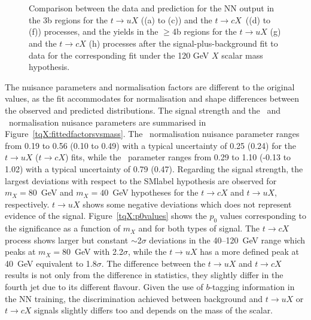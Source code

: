 \begin{figure}[htb]
    \RawFloats
    \centering
     \\
     \\ 
    \caption{Comparison between the data and prediction for the NN output in the 3b regions for the $t\to uX$ ((a) to (c))
    and the $t\to cX$\ ((d) to (f)) processes, 
    and the yields in the $\geq$4b regions for the $t\to uX$ (g) and the $t\to cX$ (h) processes 
    after the signal-plus-background fit to data for the corresponding fit under the 120 GeV $X$ scalar mass hypothesis.}
    \label{tqX:NNfit120}
\end{figure}


\clearpage

The nuisance parameters and normalisation factors are different to the original values, as the fit accommodates for normalisation and shape differences between the observed and predicted distributions. The signal strength and the \ttb\ and \ttc\ normalisation nuisance parameters are summarised in Figure~\ref{tqX:fittedfactorsvsmass}. The \ttb\ normalisation nuisance parameter ranges from 0.19 to 0.56 (0.10 to 0.49) with a typical uncertainty of 0.25 (0.24) for the $t\to uX$ ($t\to cX$) fits, while the \ttc\ parameter ranges from 0.29 to 1.10 (-0.13 to 1.02) with a typical uncertainty of 0.79 (0.47). Regarding the signal strength, the largest deviations with respect to the \acrshort{SMlabel} hypothesis are observed for $m_X=80$~GeV  and $m_X=40$~GeV hypotheses for the $t\to cX$ and $t\to uX$, respectively. $t\to uX$ shows some negative deviations which does not represent evidence of the signal. Figure~\ref{tqX:p0values} shows the $p_0$ values corresponding to the significance as a function of $m_X$ and for both types of signal. The $t\to cX$ process shows larger but constant $\sim$2$\sigma$ deviations in the 40--120~GeV range which peaks at $m_X=80$~GeV with 2.2$\sigma$, while the $t\to uX$ has a more defined peak at 40~GeV equivalent to 1.8$\sigma$. The difference between the $t\to uX$ and $t\to cX$ results is not only from the difference in statistics, they slightly differ in the fourth jet due to its different flavour. Given the use of $b$-tagging information in the NN training, the discrimination achieved between background and $t\to uX$ or $t\to cX$ signals slightly differs too and depends on the mass of the scalar.


